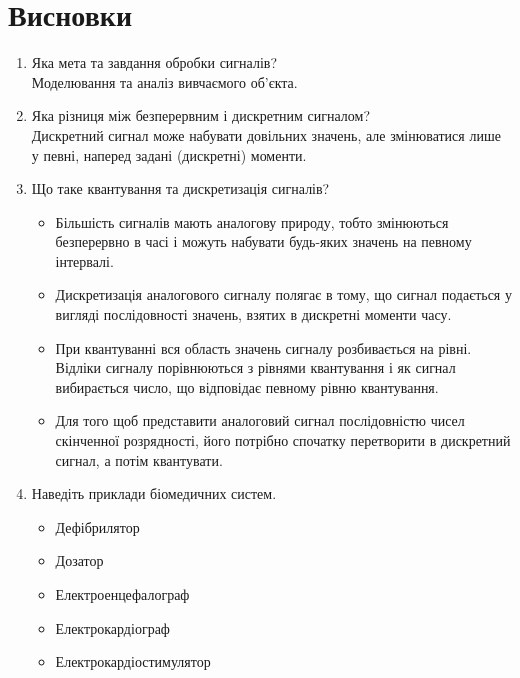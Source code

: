 \section{Висновки}
\label{sec:summary}

\begin{enumerate}
    \item
          Яка мета та завдання обробки сигналів? \\
          Моделювання та аналіз вивчаємого об'єкта.

    \item
          Яка різниця між безперервним і дискретним сигналом? \\
          Дискретний сигнал може набувати довільних значень,
          але змінюватися лише у певні, наперед задані (дискретні) моменти.

    \item
          Що таке квантування та дискретизація сигналів?
          \begin{itemize}
              \item
                    Більшість сигналів мають аналогову природу,
                    тобто змінюються безперервно в часі
                    і можуть набувати будь-яких значень на певному інтервалі.

              \item
                    Дискретизація аналогового сигналу полягає в тому,
                    що сигнал подається у вигляді послідовності значень,
                    взятих в дискретні моменти часу.

              \item
                    При квантуванні вся область значень сигналу розбивається на рівні.
                    Відліки сигналу порівнюються з рівнями квантування і як сигнал вибирається число,
                    що відповідає певному рівню квантування.

              \item
                    Для того щоб представити аналоговий сигнал послідовністю чисел скінченної розрядності,
                    його потрібно спочатку перетворити в дискретний сигнал, а потім квантувати.
          \end{itemize}

    \item
          Наведіть приклади біомедичних систем.
          \begin{itemize}
              \item
                    Дефібрилятор

              \item
                    Дозатор

              \item
                    Електроенцефалограф

              \item
                    Електрокардіограф

              \item
                    Електрокардіостимулятор
          \end{itemize}
\end{enumerate}
